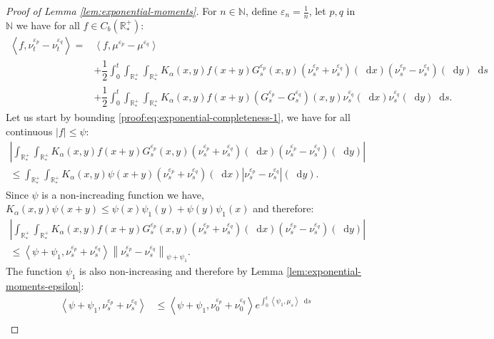 \documentclass[11pt,a4paper]{article}
\newcommand{\NN}{\mathbb{N}}
\newcommand{\RRP}{\mathbb{R}^+_*}
\newcommand{\brac}[1]{\left\langle#1\right\rangle}
\newcommand{\dd}{\mathop{}\!\mathrm{d}}
\begin{document}
\begin{proof}[Proof of Lemma \ref{lem:exponential-moments}]
    For $n\in \NN$, define $\varepsilon_n = \frac1n$, let $p,q$ in $\NN$ we have for all $f \in C_b(\RRP)$:
    \begin{subequations}
    \begin{align}
        \brac{f,\nu_t^{\varepsilon_p}-\nu_t^{\varepsilon_q}} =& \brac{f,\mu^{\varepsilon_p} - \mu^{\varepsilon_q}} 
        \nonumber \\
        &+ \dfrac12\int_0^t \int_{\RRP}\int_{\RRP}K_\alpha(x,y)f(x+y) G^{\varepsilon_p}_s(x,y)(\nu_s^{\varepsilon_p} + \nu_s^{\varepsilon_q})(\dd x)(\nu_s^{\varepsilon_p} -\nu_s^{\varepsilon_q} )(\dd y)\dd s \label{proof:eq:exponential-completeness-1}\\
        &+ \dfrac12\int_0^t\int_{\RRP}\int_{\RRP}K_\alpha(x,y)f(x+y) (G^{\varepsilon_p}_s - G^{\varepsilon_q}_s)(x,y)\nu_s^{\varepsilon_q}(\dd x)\nu_s^{\varepsilon_q}(\dd y) \dd s.\label{proof:eq:exponential-completeness-2}
    \end{align}
    \label{proof:eq:exponential-completeness}
    \end{subequations}
    Let us start by bounding \eqref{proof:eq:exponential-completeness-1}, we have for all continuous $|f| \leq \psi$:
    \begin{multline*}
        \left|\int_{\RRP}\int_{\RRP}K_\alpha(x,y)f(x+y) G^{\varepsilon_p}_s(x,y)(\nu_s^{\varepsilon_p} + \nu_s^{\varepsilon_q})(\dd x)(\nu_s^{\varepsilon_p} -\nu_s^{\varepsilon_q} )(\dd y)\right| \\
        \leq \int_{\RRP}\int_{\RRP}K_\alpha(x,y)\psi(x+y) (\nu_s^{\varepsilon_p} + \nu_s^{\varepsilon_q})(\dd x)\left|\nu_s^{\varepsilon_p} -\nu_s^{\varepsilon_q} \right|(\dd y).
    \end{multline*}
    Since $\psi$ is a non-increading function we have, $K_\alpha(x,y)\psi(x+y) \leq \psi(x)\psi_1(y) + \psi(y)\psi_1(x)$ and therefore:
    \begin{multline*}
        \left|\int_{\RRP}\int_{\RRP}K_\alpha(x,y)f(x+y) G^{\varepsilon_p}_s(x,y)(\nu_s^{\varepsilon_p} + \nu_s^{\varepsilon_q})(\dd x)\left(\nu_s^{\varepsilon_p} -\nu_s^{\varepsilon_q}\right)(\dd y)\right| \\
        \leq \brac{\psi + \psi_1, \nu_s^{\varepsilon_p} + \nu_s^{\varepsilon_q}} \left\|\nu_s^{\varepsilon_p} - \nu_s^{\varepsilon_q} \right\|_{\psi + \psi_1}.
    \end{multline*}
    The function $\psi_1$ is also non-increasing and therefore by Lemma \ref{lem:exponential-moments-epsilon}:
    \begin{align*}
        \brac{\psi + \psi_1, \nu_s^{\varepsilon_p} + \nu_s^{\varepsilon_q}} &\leq \brac{\psi + \psi_1, \nu_0^{\varepsilon_p} + \nu_0^{\varepsilon_q}} e^{\int_0^t \brac{\psi_1,\mu_s}\dd s}\\

\end{align*}
\end{proof}
\end{document}
